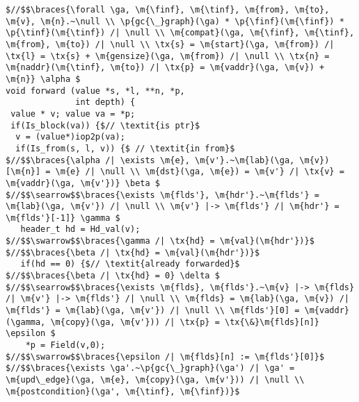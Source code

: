 \newcommand{\finf}{finf}
\newcommand{\tinf}{tinf}
\newcommand{\out}{out}
\newcommand{\braces}[1]{\left\{\!\!\!\begin{array}{l@{}} #1 \end{array}\right\}}
\newcommand{\ga}{\gamma}
\newcommand{\Eg}{E_\ga}
\newcommand{\Vg}{V_\ga}

\begin{figure*}[!ht]
\vspace{-1ex}
  \begin{lstlisting}[multicols=2]
$//$$\braces{\forall \ga, \m{\finf}, \m{\tinf}, \m{from}, \m{to}, \m{v}, \m{n}.~\null \\ \p{gc{\_}graph}(\ga) * \p{\finf}(\m{\finf}) * \p{\tinf}(\m{\tinf}) /| \null \\ \m{compat}(\ga, \m{\finf}, \m{\tinf}, \m{from}, \m{to}) /| \null \\ \tx{s} = \m{start}(\ga, \m{from}) /| \tx{l} = \tx{s} + \m{gensize}(\ga, \m{from}) /| \null \\ \tx{n} = \m{naddr}(\m{\tinf}, \m{to}) /| \tx{p} = \m{vaddr}(\ga, \m{v}) + \m{n}} \alpha $
void forward (value *s, *l, **n, *p, 
              int depth) {
 value * v; value va = *p; 
 if(Is_block(va)) {$// \textit{is ptr}$
  v = (value*)iop2p(va); 
  if(Is_from(s, l, v)) {$ // \textit{in from}$
$//$$\braces{\alpha /| \exists \m{e}, \m{v'}.~\m{lab}(\ga, \m{v})[\m{n}] = \m{e} /| \null \\ \m{dst}(\ga, \m{e}) = \m{v'} /| \tx{v} = \m{vaddr}(\ga, \m{v'})} \beta $
$//$$\searrow$$\braces{\exists \m{flds'}, \m{hdr'}.~\m{flds'} = \m{lab}(\ga, \m{v'}) /| \null \\ \m{v'} |-> \m{flds'} /| \m{hdr'} = \m{flds'}[-1]} \gamma $
   header_t hd = Hd_val(v);
$//$$\swarrow$$\braces{\gamma /| \tx{hd} = \m{val}(\m{hdr'})}$
$//$$\braces{\beta /| \tx{hd} = \m{val}(\m{hdr'})}$ 
   if(hd == 0) {$// \textit{already forwarded}$
$//$$\braces{\beta /| \tx{hd} = 0} \delta $ 
$//$$\searrow$$\braces{\exists \m{flds}, \m{flds'}.~\m{v} |-> \m{flds} /| \m{v'} |-> \m{flds'} /| \null \\ \m{flds} = \m{lab}(\ga, \m{v}) /| \m{flds'} = \m{lab}(\ga, \m{v'}) /| \null \\ \m{flds'}[0] = \m{vaddr}(\gamma, \m{copy}(\ga, \m{v'})) /| \tx{p} = \tx{\&}\m{flds}[n]} \epsilon $
    *p = Field(v,0);
$//$$\swarrow$$\braces{\epsilon /| \m{flds}[n] := \m{flds'}[0]}$
$//$$\braces{\exists \ga'.~\p{gc{\_}graph}(\ga') /| \ga' = \m{upd\_edge}(\ga, \m{e}, \m{copy}(\ga, \m{v'})) /| \null \\ \m{postcondition}(\ga', \m{\tinf}, \m{\finf})}$

\end{lstlisting}
\end{figure*}
